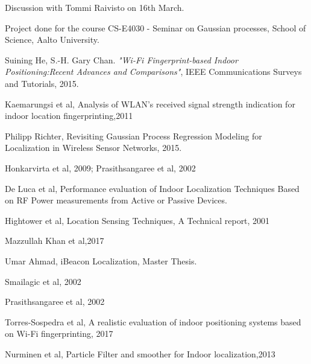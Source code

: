 \documentclass[a4paper,draft]{article}
\begin{document}
\begin{thebibliography}{9}
 Discussion with Tommi Raivisto on 16th March.

 Project done for the course CS-E4030 - Seminar on Gaussian processes, School of Science, Aalto University.
 
Suining He, S.-H. Gary Chan. \textit{"Wi-Fi Fingerprint-based Indoor Positioning:Recent Advances and Comparisons"}, IEEE Communications Surveys and Tutorials, 2015.

Kaemarungsi et al, Analysis of WLAN’s received signal strength indication for indoor location fingerprinting,2011

Philipp Richter, Revisiting Gaussian Process Regression Modeling for Localization in Wireless Sensor Networks, 2015.
 
 Honkarvirta et al, 2009; Prasithsangaree et al, 2002
 
 De Luca et al, Performance evaluation of Indoor Localization Techniques Based on RF Power measurements from Active or Passive Devices.
 
Hightower et al, Location Sensing Techniques, A Technical report, 2001

Mazzullah Khan et al,2017

Umar Ahmad, iBeacon Localization, Master Thesis.

Smailagic et al, 2002

Prasithsangaree et al, 2002

Torres-Sospedra et al, A realistic evaluation of indoor positioning systems based on Wi-Fi fingerprinting, 2017

Nurminen et al, Particle Filter and smoother for Indoor localization,2013

\end{thebibliography}
\end{document}
